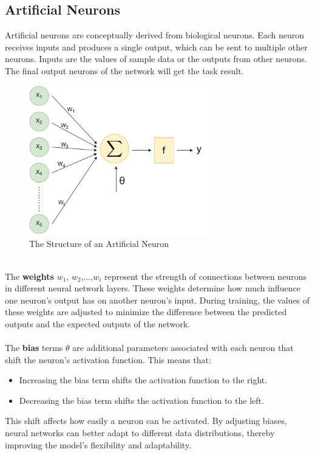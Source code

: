 \documentclass[english,version-2022-01]{uzl-thesis}
\begin{document}
\subsection{Artificial Neurons} Artificial neurons are conceptually derived from biological neurons. Each neuron receives inputs and produces a single output, which can be sent to multiple other neurons.\cite{Application} Inputs are the values of sample data or the outputs from other neurons. The final output neurons of the network will get the task result.\\
\begin{figure}[htpb]
  \centering
  \includegraphics[width=0.7\textwidth]{pic/neurons (1).pdf}
  \caption{The Structure of an Artificial Neuron}
  \label{Neurons}
\end{figure}\\
The \textbf{weights} $w_{1}$, $w_{2}$,...,$w_{i}$ represent the strength of connections between neurons in different neural network layers.\cite{urban2018neural} These weights determine how much influence one neuron's output has on another neuron's input. During training, the values of these weights are adjusted to minimize the difference between the predicted outputs and the expected outputs of the network.\\
\\
The \textbf{bias} terms $\theta$ are additional parameters associated with each neuron that shift the neuron's activation function. This means that:
\begin{itemize}
    \item Increasing the bias term shifts the activation function to the right.
    \item Decreasing the bias term shifts the activation function to the left.
\end{itemize}
This shift affects how easily a neuron can be activated. By adjusting biases, neural networks can better adapt to different data distributions, thereby improving the model's flexibility and adaptability.\cite{urban2018neural}\\
\end{document}
